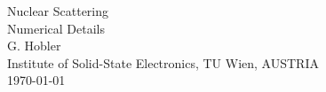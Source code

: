 %
\begin{center}
{
\vspace*{4cm}
%
\titlefont
Nuclear Scattering \\[1ex]
Numerical Details \\[3cm]
%
\authorfont
G. Hobler \\[3cm]
}
%
Institute of Solid-State Electronics,
TU Wien, AUSTRIA \\[1ex]

%
\today
%
\end{center}
